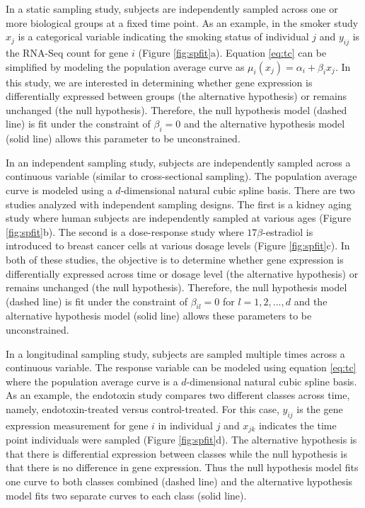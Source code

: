 \documentclass[11pt]{article}
\begin{document}
In a static sampling study, subjects are independently sampled across one or more biological groups at a fixed time point. As an example, in the smoker study $x_{j}$ is a categorical variable indicating the smoking status of individual $j$ and $y_{ij}$ is the RNA-Seq count for gene $i$ (Figure \ref{fig:spfit}a). Equation \eqref{eq:tc} can be simplified by modeling the population average curve as $\mu_{i}(x_{j}) = \alpha_{i} + \beta_{i}x_{j}$. In this study, we are interested in determining whether gene expression is differentially expressed between groups (the alternative hypothesis) or remains unchanged (the null hypothesis). Therefore, the null hypothesis model (dashed line) is fit under the constraint of $\beta_{i} = 0$ and the alternative hypothesis model (solid line) allows this parameter to be unconstrained.

In an independent sampling study, subjects are independently sampled across a continuous variable (similar to cross-sectional sampling). The population average curve is modeled using a $d$-dimensional natural cubic spline basis. There are two studies analyzed with independent sampling designs. The first is a kidney aging study where human subjects are independently sampled at various ages (Figure \ref{fig:spfit}b). The second is a dose-response study where $17\beta$-estradiol is introduced to breast cancer cells at various dosage levels (Figure \ref{fig:spfit}c). In both of these studies, the objective is to determine whether gene expression is differentially expressed across time or dosage level (the alternative hypothesis) or remains unchanged (the null hypothesis). Therefore, the null hypothesis model (dashed line) is fit under the constraint of $\beta_{il}=0$ for $l = 1,2,...,d$ and the alternative hypothesis model (solid line) allows these parameters to be unconstrained.

In a longitudinal sampling study, subjects are sampled multiple times across a continuous variable. The response variable can be modeled using equation \eqref{eq:tc} where the population average curve is a $d$-dimensional natural cubic spline basis. As an example, the endotoxin study compares two different classes across time, namely, endotoxin-treated versus control-treated. For this case, $y_{ij}$ is the gene expression measurement for gene $i$ in individual $j$ and $x_{jk}$ indicates the time point individuals were sampled (Figure \ref{fig:spfit}d). The alternative hypothesis is that there is differential expression between classes while the null hypothesis is that there is no difference in gene expression. Thus the null hypothesis model fits one curve to both classes combined (dashed line) and the alternative hypothesis model fits two separate curves to each class (solid line).
\end{document}
